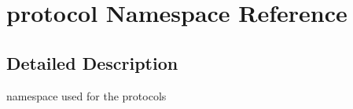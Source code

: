 \hypertarget{namespaceprotocol}{\section{protocol Namespace Reference}
\label{namespaceprotocol}
}


\subsection{Detailed Description}
namespace used for the protocols 